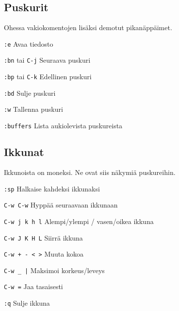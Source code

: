 \documentclass{article}
\newcommand{\com}[1]{{\large{\texttt{#1}}}}
\newcommand{\Com}[1]{\com{#1}  }
\begin{document}
\begin{multicols}{4}
\subsection*{Puskurit}
Ohessa vakiokomentojen lisäksi demotut pikanäppäimet.
\begin{description}
\item{\Com{:e}} Avaa tiedosto 
\item{\com{:bn} tai \Com{C-j}} Seuraava puskuri
\item{\com{:bp} tai \Com{C-k}} Edellinen puskuri
\item{\Com{:bd}} Sulje puskuri
\item{\Com{:w}} Tallenna puskuri 
\item{\Com{:buffers}} Lista aukiolevista puskureista
\end{description}

\subsection*{Ikkunat}
Ikkunoista on moneksi. Ne ovat siis näkymiä puskureihin.
\begin{description}
\item{\Com{:sp}} Halkaise kahdeksi ikkunaksi
\item{\Com{C-w C-w}} Hyppää seuraavaan ikkunaan
\item{\Com{C-w j k h l}} Alempi/ylempi / vasen/oikea ikkuna
\item{\Com{C-w J K H L}} Siirrä ikkuna
\item{\Com{C-w + - < >}} Muuta kokoa
\item{\Com{C-w \_ |}} Maksimoi korkeus/leveys
\item{\Com{C-w =}} Jaa tasaisesti
\item{\Com{:q}} Sulje ikkuna
\end{description}

\end{multicols}
\end{document}
